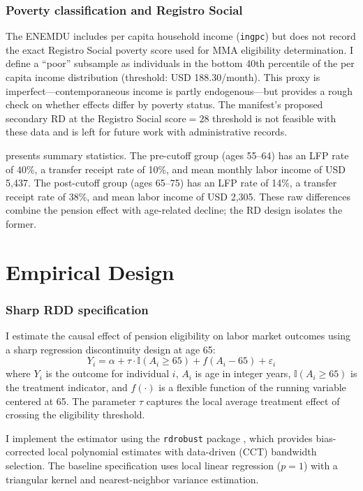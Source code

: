 \documentclass[12pt]{article}
\newcommand{\ind}{\mathbb{I}}
\begin{document}
\subsubsection*{Poverty classification and Registro Social} The ENEMDU includes per capita household income (\texttt{ingpc}) but does not record the exact Registro Social poverty score used for MMA eligibility determination. I define a ``poor'' subsample as individuals in the bottom 40th percentile of the per capita income distribution (threshold: USD 188.30/month). This proxy is imperfect---contemporaneous income is partly endogenous---but provides a rough check on whether effects differ by poverty status. The manifest's proposed secondary RD at the Registro Social score$=28$ threshold is not feasible with these data and is left for future work with administrative records.

 presents summary statistics. The pre-cutoff group (ages 55--64) has an LFP rate of 40\%, a transfer receipt rate of 10\%, and mean monthly labor income of USD 5,437. The post-cutoff group (ages 65--75) has an LFP rate of 14\%, a transfer receipt rate of 38\%, and mean labor income of USD 2,305. These raw differences combine the pension effect with age-related decline; the RD design isolates the former.




\section{Empirical Design}
\label{sec:design}

\subsubsection*{Sharp RDD specification} I estimate the causal effect of pension eligibility on labor market outcomes using a sharp regression discontinuity design at age 65:
\begin{equation}
Y_i = \alpha + \tau \cdot \ind(A_i \geq 65) + f(A_i - 65) + \varepsilon_i
\label{eq:rdd}
\end{equation}
where $Y_i$ is the outcome for individual $i$, $A_i$ is age in integer years, $\ind(A_i \geq 65)$ is the treatment indicator, and $f(\cdot)$ is a flexible function of the running variable centered at 65. The parameter $\tau$ captures the local average treatment effect of crossing the eligibility threshold.

I implement the estimator using the \texttt{rdrobust} package \citep{calonico2014,calonico2020}, which provides bias-corrected local polynomial estimates with data-driven (CCT) bandwidth selection. The baseline specification uses local linear regression ($p = 1$) with a triangular kernel and nearest-neighbor variance estimation.
\end{document}
